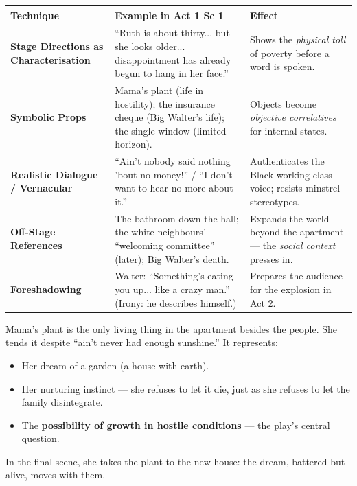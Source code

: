 \documentclass[11pt]{article}
\begin{document}
\begin{center}
\begin{tabularx}{\linewidth}{|l|X|X|}\hline
\rowcolor{popblueL}
\textbf{Technique} & \textbf{Example in Act 1 Sc 1} & \textbf{Effect} \\ \hline
\textbf{Stage Directions as Characterisation} & ``Ruth is about thirty... but she looks older... disappointment has already begun to hang in her face.'' & Shows the \emph{physical toll} of poverty before a word is spoken. \\ \hline
\textbf{Symbolic Props} & Mama's plant (life in hostility); the insurance cheque (Big Walter's life); the single window (limited horizon). & Objects become \emph{objective correlatives} for internal states. \\ \hline
\textbf{Realistic Dialogue / Vernacular} & ``Ain't nobody said nothing 'bout no money!'' / ``I don't want to hear no more about it.'' & Authenticates the Black working-class voice; resists minstrel stereotypes. \\ \hline
\textbf{Off-Stage References} & The bathroom down the hall; the white neighbours' ``welcoming committee'' (later); Big Walter's death. & Expands the world beyond the apartment — the \emph{social context} presses in. \\ \hline
\textbf{Foreshadowing} & Walter: ``Something's eating you up... like a crazy man.'' (Irony: he describes himself.) & Prepares the audience for the explosion in Act 2. \\ \hline
\end{tabularx}
\end{center}

\begin{savaistu}
Mama's plant is the only living thing in the apartment besides the people. She tends it despite ``ain't never had enough sunshine.'' It represents:
\begin{itemize}
\item Her dream of a garden (a house with earth).
\item Her nurturing instinct — she refuses to let it die, just as she refuses to let the family disintegrate.
\item The \textbf{possibility of growth in hostile conditions} — the play's central question.
\end{itemize}
In the final scene, she takes the plant to the new house: the dream, battered but alive, moves with them.
\end{savaistu}
\end{document}
